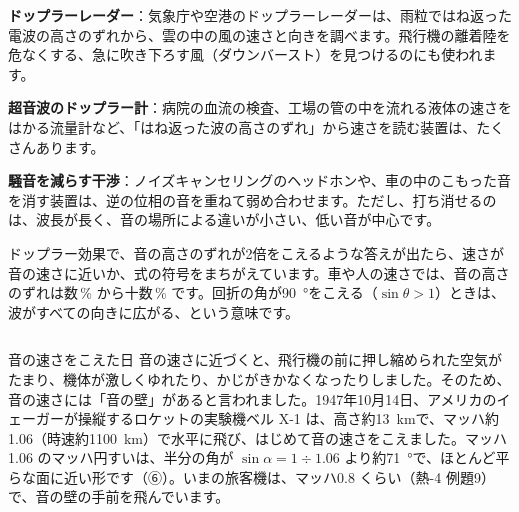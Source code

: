 \begin{phkougaku}[重なりと高さのずれを使う]
\textbf{ドップラーレーダー}：気象庁や空港のドップラーレーダーは、雨粒ではね返った電波の高さのずれから、雲の中の風の速さと向きを調べます。飛行機の離着陸を危なくする、急に吹き下ろす風（ダウンバースト）を見つけるのにも使われます。

\textbf{超音波のドップラー計}：病院の血流の検査、工場の管の中を流れる液体の速さをはかる流量計など、「はね返った波の高さのずれ」から速さを読む装置は、たくさんあります。

\textbf{騒音を減らす干渉}：ノイズキャンセリングのヘッドホンや、車の中のこもった音を消す装置は、逆の位相の音を重ねて弱め合わせます。ただし、打ち消せるのは、波長が長く、音の場所による違いが小さい、低い音が中心です。

\begin{phketa}[波の重なりと高さのずれの数の目安]
ドップラー効果で、音の高さのずれが2倍をこえるような答えが出たら、速さが音の速さに近いか、式の符号をまちがえています。車や人の速さでは、音の高さのずれは数\,\% から十数\,\% です。回折の角が\qty{90}{\degree}をこえる（$\sin\theta>1$）ときは、波がすべての向きに広がる、という意味です。
\end{phketa}
\end{phkougaku}

\begin{column}{音の速さをこえた日}
音の速さに近づくと、飛行機の前に押し縮められた空気がたまり、機体が激しくゆれたり、かじがきかなくなったりしました。そのため、音の速さには「音の壁」があると言われました。1947年10月14日、アメリカのイェーガーが操縦するロケットの実験機ベル X-1 は、高さ約\qty{13}{km}で、マッハ約1.06（時速約\qty{1100}{km}）で水平に飛び、はじめて音の速さをこえました。マッハ1.06 のマッハ円すいは、半分の角が $\sin\alpha=1\div1.06$ より約\qty{71}{\degree}で、ほとんど平らな面に近い形です（⑥）。いまの旅客機は、マッハ0.8 くらい（熱-4 例題9）で、音の壁の手前を飛んでいます。
\end{column}

